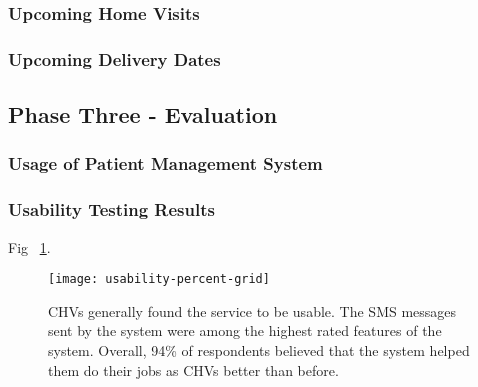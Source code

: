 \subsubsection{Upcoming Home Visits}

\subsubsection{Upcoming Delivery Dates}


\subsection{Phase Three - Evaluation}
\subsubsection{Usage of Patient Management System}

\subsubsection{Usability Testing Results}
Fig ~\ref{fig:barchart}.
\begin{figure}[h]
	\begin{center}
	\texttt{[image: usability-percent-grid]}
	\end{center}
	\caption{CHVs generally found the service to be usable. The SMS messages sent by the system were among the highest rated features of the system. Overall, 94\% of respondents believed that the system helped them do their jobs as CHVs better than before.}
	\label{fig:barchart}
\end{figure}

